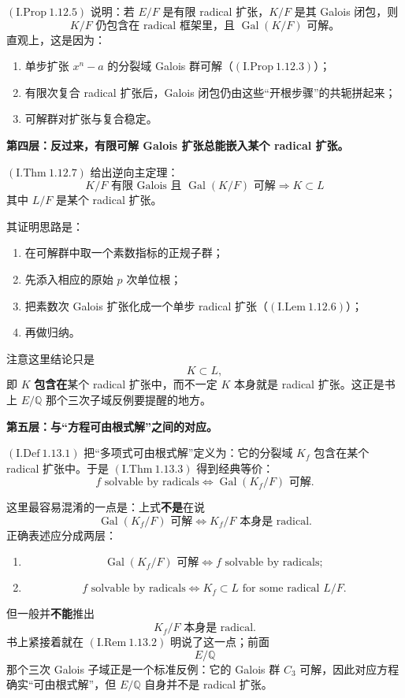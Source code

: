 \documentclass[a4paper]{ctexart}
\theoremstyle{definition}
\theoremstyle{analysis}
\theoremstyle{plain}
\begin{document}
\((\mathrm{I.Prop}\ 1.12.5)\) 说明：若 \(E/F\) 是有限 radical 扩张，\(K/F\) 是其 Galois 闭包，则
\[
  K/F \text{ 仍包含在 radical 框架里，且 } \operatorname{Gal}(K/F)\text{ 可解。}
\]
直观上，这是因为：
\begin{enumerate}
  \item 单步扩张 \(x^n-a\) 的分裂域 Galois 群可解（\((\mathrm{I.Prop}\ 1.12.3)\)）；
  \item 有限次复合 radical 扩张后，Galois 闭包仍由这些“开根步骤”的共轭拼起来；
  \item 可解群对扩张与复合稳定。
\end{enumerate}

\medskip

\textbf{第四层：反过来，有限可解 Galois 扩张总能嵌入某个 radical 扩张。}

\((\mathrm{I.Thm}\ 1.12.7)\) 给出逆向主定理：
\[
  K/F \text{ 有限 Galois 且 } \operatorname{Gal}(K/F)\text{ 可解}
  \Longrightarrow
  K \subset L
\]
其中 \(L/F\) 是某个 radical 扩张。

其证明思路是：
\begin{enumerate}
  \item 在可解群中取一个素数指标的正规子群；
  \item 先添入相应的原始 \(p\) 次单位根；
  \item 把素数次 Galois 扩张化成一个单步 radical 扩张（\((\mathrm{I.Lem}\ 1.12.6)\)）；
  \item 再做归纳。
\end{enumerate}

注意这里结论只是
\[
  K\subset L,
\]
即 \(K\) \textbf{包含在}某个 radical 扩张中，而不一定 \(K\) 本身就是 radical 扩张。这正是书上 \(E/\mathbb Q\) 那个三次子域反例要提醒的地方。

\medskip

\textbf{第五层：与“方程可由根式解”之间的对应。}

\((\mathrm{I.Def}\ 1.13.1)\) 把“多项式可由根式解”定义为：它的分裂域 \(K_f\) 包含在某个 radical 扩张中。于是
\((\mathrm{I.Thm}\ 1.13.3)\) 得到经典等价：
\[
  f \text{ solvable by radicals}
  \iff
  \operatorname{Gal}(K_f/F)\text{ 可解}.
\]

这里最容易混淆的一点是：上式\textbf{不是}在说
\[
  \operatorname{Gal}(K_f/F)\text{ 可解}
  \iff
  K_f/F \text{ 本身是 radical}.
\]
正确表述应分成两层：
\begin{enumerate}
  \item
  \[
    \operatorname{Gal}(K_f/F)\text{ 可解}
    \iff
    f \text{ solvable by radicals};
  \]
  \item
  \[
    f \text{ solvable by radicals}
    \iff
    K_f \subset L \text{ for some radical } L/F.
  \]
\end{enumerate}
但一般并\textbf{不能}推出
\[
  K_f/F \text{ 本身是 radical}.
\]
书上紧接着就在 \((\mathrm{I.Rem}\ 1.13.2)\) 明说了这一点；前面
\[
  E/\mathbb Q
\]
那个三次 Galois 子域正是一个标准反例：它的 Galois 群 \(C_3\) 可解，因此对应方程确实“可由根式解”，但 \(E/\mathbb Q\) 自身并不是 radical 扩张。
\end{document}
